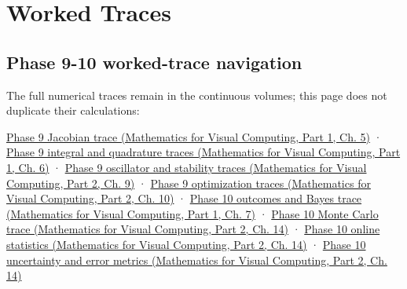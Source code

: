 \hypertarget{appendix-92ff77d4dfdc}{}\label{referencestart:appendix-92ff77d4dfdc}
\section{Worked Traces}\label{appendix-92ff77d4dfdc-worked-traces}

\hypertarget{appendix-92ff77d4dfdc-worked-traces}{}

\subsection{Phase 9-10 worked-trace navigation}\label{appendix-92ff77d4dfdc-phase-9-10-worked-trace-navigation}

\hypertarget{appendix-92ff77d4dfdc-phase-9-10-worked-trace-navigation}{}

The full numerical traces remain in the continuous volumes; this page does not duplicate their calculations:

\href{../02-Mathematics-for-Visual-Computing-P01/main.pdf\#nameddest=02-foundations-ii-ch021-jacobians-curvature-and-local-approximation}{Phase 9 Jacobian trace (Mathematics for Visual Computing, Part 1, Ch. 5)} · \href{../02-Mathematics-for-Visual-Computing-P01/main.pdf\#nameddest=02-foundations-ii-ch022-integration-and-quadrature}{Phase 9 integral and quadrature traces (Mathematics for Visual Computing, Part 1, Ch. 6)} · \href{../02-Mathematics-for-Visual-Computing-P02/main.pdf\#nameddest=02-foundations-ii-ch025-odes-and-numerical-simulation}{Phase 9 oscillator and stability traces (Mathematics for Visual Computing, Part 2, Ch. 9)} · \href{../02-Mathematics-for-Visual-Computing-P02/main.pdf\#nameddest=02-foundations-ii-ch026-optimization-and-inverse-problems}{Phase 9 optimization traces (Mathematics for Visual Computing, Part 2, Ch. 10)} · \href{../02-Mathematics-for-Visual-Computing-P01/main.pdf\#nameddest=02-foundations-ii-ch023-a-probability-model-begins-with-possible-outcomes}{Phase 10 outcomes and Bayes trace (Mathematics for Visual Computing, Part 1, Ch. 7)} · \href{../02-Mathematics-for-Visual-Computing-P02/main.pdf\#nameddest=02-foundations-ii-ch030-monte-carlo-estimates-trade-computation-for-uncertainty}{Phase 10 Monte Carlo trace (Mathematics for Visual Computing, Part 2, Ch. 14)} · \href{../02-Mathematics-for-Visual-Computing-P02/main.pdf\#nameddest=02-foundations-ii-ch030-finite-samples-need-stable-descriptive-statistics}{Phase 10 online statistics (Mathematics for Visual Computing, Part 2, Ch. 14)} · \href{../02-Mathematics-for-Visual-Computing-P02/main.pdf\#nameddest=02-foundations-ii-ch030-inference-and-error-metrics-need-explicit-assumptions}{Phase 10 uncertainty and error metrics (Mathematics for Visual Computing, Part 2, Ch. 14)}

